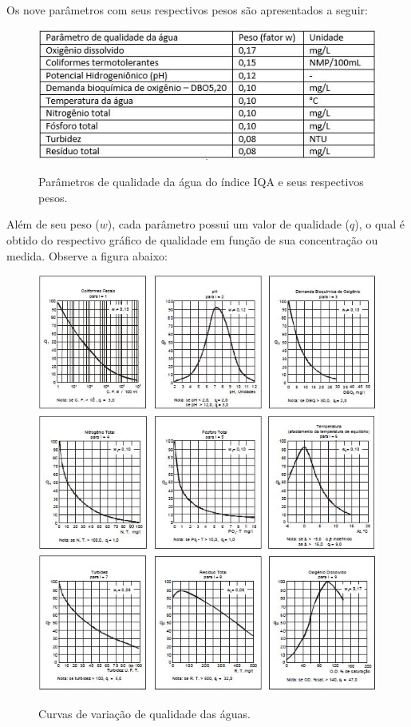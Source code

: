 Os nove parâmetros com seus respectivos pesos são apresentados a seguir:

\begin{figure}[!h]
\centering
\includegraphics[scale=0.8]{editaveis/figuras/tabela_parametros_unidade}
\FloatBarrier
\label{tabela_parametros_unidade}
\caption[Parâmetros de qualidade da água do índice IQA e seus respectivos pesos]
  {Parâmetros de qualidade da água do índice IQA e seus respectivos pesos. \footnotemark}
\end{figure}

Além de seu peso ($w$), cada parâmetro possui um valor de qualidade ($q$), o qual é obtido do respectivo gráfico de qualidade
em função de sua concentração ou medida. Observe a figura abaixo:

\begin{figure}[!h]
\centering
\includegraphics[scale=0.5]{editaveis/figuras/graficos_parametros}
\label{graficos_parametros}
\caption[Curvas de variação de qualidade das águas]{Curvas de variação de qualidade das águas.\footnotemark}
\end{figure}
\FloatBarrier
{}

